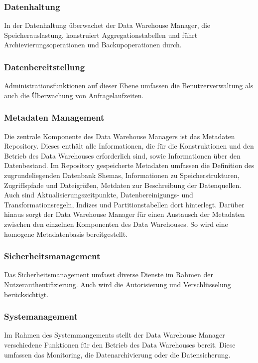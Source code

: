 \subsubsection{Datenhaltung}\label{ssec:Datenhaltung}
In der Datenhaltung überwachet der Data Warehouse Manager, die Speicherauslastung, konstruiert Aggregationstabellen und führt Archievierungsoperationen und Backupoperationen durch.
\subsubsection{Datenbereitstellung}\label{ssec:Datenbereitstellung}
Administrationsfunktionen auf dieser Ebene umfassen die Benutzerverwaltung als auch die Überwachung von Anfragelaufzeiten. 
\subsubsection{Metadaten Management}\label{ssec:Metadaten-Management}
Die zentrale Komponente des Data Warehouse Managers ist das Metadaten Repository. Dieses enthält alle Informationen, die für die Konstruktionen und den Betrieb des Data Warehouses erforderlich sind, sowie Informationen über den Datenbestand. Im Repository  gespeicherte Metadaten umfassen die Definition des zugrundeliegenden Datenbank Shemas, Informationen zu Speicherstrukturen, Zugriffspfade und Dateigrößen, Metdaten zur Beschreibung der Datenquellen. Auch sind Aktualisierungszeitpunkte, Datenbereinigungs- und Transformationsregeln, Indizes und Partitionstabellen dort hinterlegt. Darüber hinaus sorgt der Data Warehouse Manager für einen Austausch der Metadaten zwischen den einzelnen Komponenten des Data Warehouses. So wird eine homogene Metadatenbasis bereitgestellt.
\subsubsection{Sicherheitsmanagement}\label{ssec:Sicherheitsmanagement}
Das Sicherheitsmanagement umfasst diverse Dienste im Rahmen der Nutzerauthentifizierung. Auch wird die Autorisierung und Verschlüsselung berücksichtigt.
\subsubsection{Systemanagement}\label{ssec:Systemmanagement}
Im Rahmen des Systemmangements stellt der Data Warehouse Manager verschiedene Funktionen für den Betrieb des Data Warehouses bereit. Diese umfassen das Monitoring, die Datenarchivierung oder die Datensicherung.